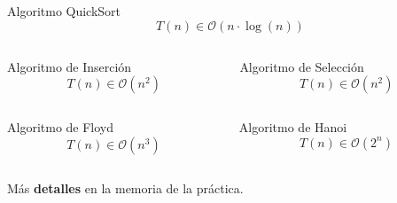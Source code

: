 \documentclass[8pt, aspectratio=169]{beamer}
\begin{document}
\begin{frame}
\begin{columns}
            \begin{column}{0.4\textwidth}
                \begin{alertblock}{Algoritmo QuickSort}
                    $$T(n) \in \mathcal{O}(n\cdot\log(n))$$
                \end{alertblock}
            \end{column}
        \end{columns}

        \begin{columns}
            \begin{column}{0.4\textwidth}
                \begin{alertblock}{Algoritmo de Inserción}
                    $$T(n) \in \mathcal{O}(n^2)$$
                \end{alertblock}
            \end{column}
            
            \begin{column}{0.4\textwidth}
                \begin{block}{Algoritmo de Selección}
                    $$T(n) \in \mathcal{O}(n^2)$$
                \end{block}
            \end{column}
        \end{columns}
        
        \begin{columns}
            \begin{column}{0.4\textwidth}
                \begin{alertblock}{Algoritmo de Floyd}
                    $$T(n) \in \mathcal{O}(n^3)$$
                \end{alertblock}
            \end{column}

            \begin{column}{0.4\textwidth}
                \begin{alertblock}{Algoritmo de Hanoi}
                    $$T(n) \in \mathcal{O}(2^n)$$
                \end{alertblock}
            \end{column}
        \end{columns}
        
        \vspace{1cm}
        Más \textbf{detalles} en la memoria de la práctica. 
    \end{frame}
\end{document}
